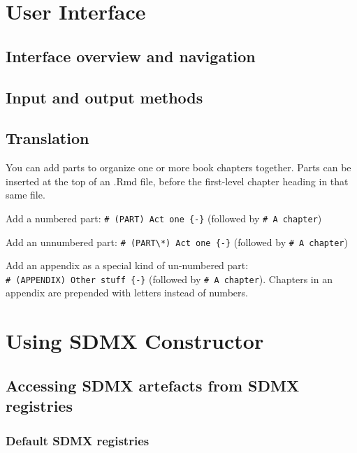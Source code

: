 \documentclass[
]{book}
\theoremstyle{definition}
\theoremstyle{definition}
\theoremstyle{definition}
\theoremstyle{definition}
\theoremstyle{remark}
\begin{document}
\hypertarget{user-interface}{%
\chapter{User Interface}\label{user-interface}}

\hypertarget{interface-overview-and-navigation}{%
\section{Interface overview and navigation}\label{interface-overview-and-navigation}}

\hypertarget{input-and-output-methods}{%
\section{Input and output methods}\label{input-and-output-methods}}

\hypertarget{translation}{%
\section{Translation}\label{translation}}

You can add parts to organize one or more book chapters together. Parts can be inserted at the top of an .Rmd file, before the first-level chapter heading in that same file.

Add a numbered part: \texttt{\#\ (PART)\ Act\ one\ \{-\}} (followed by \texttt{\#\ A\ chapter})

Add an unnumbered part: \texttt{\#\ (PART\textbackslash{}*)\ Act\ one\ \{-\}} (followed by \texttt{\#\ A\ chapter})

Add an appendix as a special kind of un-numbered part: \texttt{\#\ (APPENDIX)\ Other\ stuff\ \{-\}} (followed by \texttt{\#\ A\ chapter}). Chapters in an appendix are prepended with letters instead of numbers.

\hypertarget{using}{%
\chapter{Using SDMX Constructor}\label{using}}

\hypertarget{accessing}{%
\section{Accessing SDMX artefacts from SDMX registries}\label{accessing}}

\hypertarget{default-sdmx-registries}{%
\subsection{Default SDMX registries}\label{default-sdmx-registries}}
\end{document}

